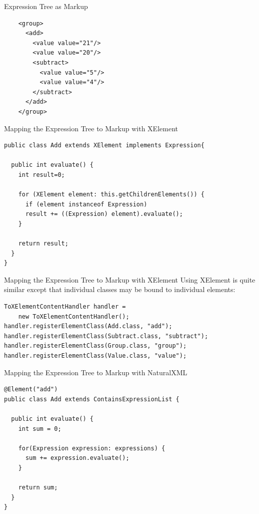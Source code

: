 \documentclass{beamer}
\begin{document}
%

\begin{frame}[fragile]{Expression Tree as Markup}
  \begin{lstlisting}
    <group>
      <add>
        <value value="21"/>
        <value value="20"/>
        <subtract>
          <value value="5"/>
          <value value="4"/>
        </subtract>
      </add>
    </group>
  \end{lstlisting}
\end{frame}

\begin{frame}[fragile]{Mapping the Expression Tree to Markup with XElement}
\begin{lstlisting}
public class Add extends XElement implements Expression{
  
  public int evaluate() {
    int result=0;
    
    for (XElement element: this.getChildrenElements()) {
      if (element instanceof Expression) 
      result += ((Expression) element).evaluate();
    }
    
    return result;
  }
}
\end{lstlisting}
\end{frame}

\begin{frame}[fragile]{Mapping the Expression Tree to Markup with XElement}
Using XElement is quite similar except that individual classes
may be bound to individual elements:
\begin{lstlisting}
ToXElementContentHandler handler = 
    new ToXElementContentHandler();
handler.registerElementClass(Add.class, "add");
handler.registerElementClass(Subtract.class, "subtract");
handler.registerElementClass(Group.class, "group");
handler.registerElementClass(Value.class, "value");
\end{lstlisting}
\end{frame}

\begin{frame}[fragile]{Mapping the Expression Tree to Markup with NaturalXML}
  \begin{lstlisting}
@Element("add")
public class Add extends ContainsExpressionList {
  
  public int evaluate() {
    int sum = 0;
    
    for(Expression expression: expressions) {
      sum += expression.evaluate();
    }
    
    return sum;
  } 
}
\end{lstlisting}
\end{frame}
\end{document}
